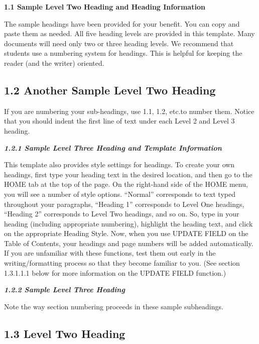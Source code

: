 \protect\hypertarget{_Toc114562011}{}{}\textbf{1.1 Sample Level Two
Heading and Heading Information}

The sample headings have been provided for your benefit. You can copy
and paste them as needed. All five heading levels are provided in this
template. Many documents will need only two or three heading levels. We
recommend that students use a numbering system for headings. This is
helpful for keeping the reader (and the writer) oriented.

\hypertarget{another-sample-level-two-heading}{%
\subsection{1.2 Another Sample Level Two
Heading}\label{another-sample-level-two-heading}}

If you are numbering your sub-headings, use 1.1, 1.2, etc.to number
them. Notice that you should indent the first line of text under each
Level 2 and Level 3 heading.

\protect\hypertarget{_Toc114562013}{}{}\emph{\textbf{1.2.1 Sample Level
Three Heading and Template Information}}

This template also provides style settings for headings. To create your
own headings, first type your heading text in the desired location, and
then go to the HOME tab at the top of the page. On the right-hand side
of the HOME menu, you will see a number of style options. ``Normal''
corresponds to text typed throughout your paragraphs, ``Heading 1''
corresponds to Level One headings, ``Heading 2'' corresponds to Level
Two headings, and so on. So, type in your heading (including appropriate
numbering), highlight the heading text, and click on the appropriate
Heading Style. Now, when you use UPDATE FIELD on the Table of Contents,
your headings and page numbers will be added automatically. If you are
unfamiliar with these functions, test them out early in the
writing/formatting process so that they become familiar to you. (See
section 1.3.1.1.1 below for more information on the UPDATE FIELD
function.)

\protect\hypertarget{_Toc114562014}{}{}\emph{\textbf{1.2.2 Sample Level
Three Heading}}

Note the way section numbering proceeds in these sample subheadings.

\hypertarget{level-two-heading}{%
\subsection{\texorpdfstring{1.3 Level Two Heading
}{1.3 Level Two Heading }}\label{level-two-heading}}

